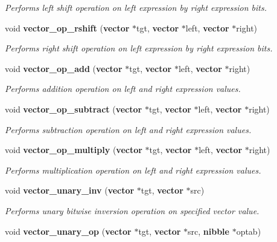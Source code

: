 \begin{CompactItemize}
\begin{CompactList}\small\item\em Performs left shift operation on left expression by right expression bits.\item\end{CompactList}\item 
void {\bf vector\_\-op\_\-rshift} ({\bf vector} $\ast$tgt, {\bf vector} $\ast$left, {\bf vector} $\ast$right)
\begin{CompactList}\small\item\em Performs right shift operation on left expression by right expression bits.\item\end{CompactList}\item 
void {\bf vector\_\-op\_\-add} ({\bf vector} $\ast$tgt, {\bf vector} $\ast$left, {\bf vector} $\ast$right)
\begin{CompactList}\small\item\em Performs addition operation on left and right expression values.\item\end{CompactList}\item 
void {\bf vector\_\-op\_\-subtract} ({\bf vector} $\ast$tgt, {\bf vector} $\ast$left, {\bf vector} $\ast$right)
\begin{CompactList}\small\item\em Performs subtraction operation on left and right expression values.\item\end{CompactList}\item 
void {\bf vector\_\-op\_\-multiply} ({\bf vector} $\ast$tgt, {\bf vector} $\ast$left, {\bf vector} $\ast$right)
\begin{CompactList}\small\item\em Performs multiplication operation on left and right expression values.\item\end{CompactList}\item 
void {\bf vector\_\-unary\_\-inv} ({\bf vector} $\ast$tgt, {\bf vector} $\ast$src)
\begin{CompactList}\small\item\em Performs unary bitwise inversion operation on specified vector value.\item\end{CompactList}\item 
void {\bf vector\_\-unary\_\-op} ({\bf vector} $\ast$tgt, {\bf vector} $\ast$src, {\bf nibble} $\ast$optab)

\end{CompactItemize}
